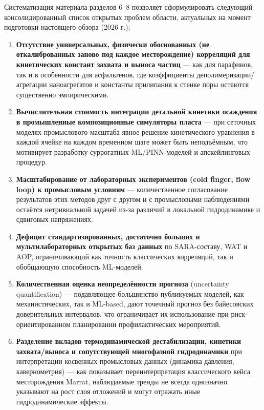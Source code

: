 \documentclass[11pt]{extarticle}
\begin{document}
Систематизация материала разделов 6--8 позволяет сформулировать следующий консолидированный список открытых проблем области, актуальных на момент подготовки настоящего обзора (2026 г.):

\begin{enumerate}
\def\labelenumi{\arabic{enumi}.}
\item
  \textbf{Отсутствие универсальных, физически обоснованных (не откалиброванных заново под каждое месторождение) корреляций для кинетических констант захвата и выноса частиц} --- как для парафинов, так и в особенности для асфальтенов, где коэффициенты деполимеризации/агрегации наноагрегатов и константы прилипания к стенке поры остаются существенно эмпирическими.
\item
  \textbf{Вычислительная стоимость интеграции детальной кинетики осаждения в промышленные композиционные симуляторы пласта} --- при сеточных моделях промыслового масштаба явное решение кинетического уравнения в каждой ячейке на каждом временном шаге может быть неподъёмным, что мотивирует разработку суррогатных ML/PINN-моделей и апскейлинговых процедур.
\item
  \textbf{Масштабирование от лабораторных экспериментов (cold finger, flow loop) к промысловым условиям} --- количественное согласование результатов этих методов друг с другом и с промысловыми наблюдениями остаётся нетривиальной задачей из-за различий в локальной гидродинамике и сдвиговых напряжениях.
\item
  \textbf{Дефицит стандартизированных, достаточно больших и мультилабораторных открытых баз данных} по SARA-составу, WAT и AOP, ограничивающий как точность классических корреляций, так и обобщающую способность ML-моделей.
\item
  \textbf{Количественная оценка неопределённости прогноза} (uncertainty quantification) --- подавляющее большинство публикуемых моделей, как механистических, так и ML-based, дают точечный прогноз без байесовских доверительных интервалов, что ограничивает их использование при риск-ориентированном планировании профилактических мероприятий.
\item
  \textbf{Разделение вкладов термодинамической дестабилизации, кинетики захвата/выноса и сопутствующей многофазной гидродинамики} при интерпретации косвенных промысловых данных (динамика давления, кавернометрия) --- как показывает переинтерпретация классического кейса месторождения Marrat, наблюдаемые тренды не всегда однозначно указывают на рост слоя отложений и могут отражать иные гидродинамические эффекты.
\end{enumerate}
\end{document}

